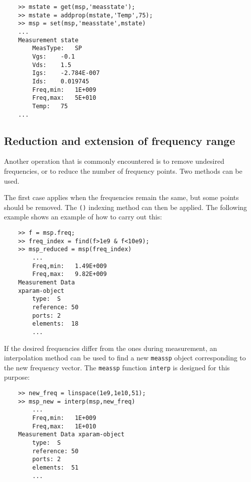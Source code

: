 \begin{small}
\begin{verbatim}
    >> mstate = get(msp,'measstate');
    >> mstate = addprop(mstate,'Temp',75);
    >> msp = set(msp,'measstate',mstate)
    ...
    Measurement state
        MeasType:   SP
        Vgs:    -0.1
        Vds:    1.5
        Igs:    -2.784E-007
        Ids:    0.019745
        Freq,min:   1E+009
        Freq,max:   5E+010
        Temp:   75
    ...
\end{verbatim}
\end{small}

\subsection{Reduction and extension of frequency range}
Another operation that is commonly encountered is to remove
undesired frequencies, or to reduce the number of frequency
points. Two methods can be used.

The first case applies when the frequencies remain the same, but
some points should be removed. The \verb"()" indexing method can
then be applied. The following example shows an example of how to
carry out this:

\begin{small}
\begin{verbatim}
    >> f = msp.freq;
    >> freq_index = find(f>1e9 & f<10e9);
    >> msp_reduced = msp(freq_index)
        ...
        Freq,min:   1.49E+009
        Freq,max:   9.82E+009
    Measurement Data
    xparam-object
        type:  S
        reference: 50
        ports: 2
        elements:  18
        ...
\end{verbatim}
\end{small}

If the desired frequencies differ from the ones during
measurement, an interpolation method can be used to find a new
\verb"meassp" object corresponding to the new frequency vector.
The \verb"meassp" function \verb"interp" is designed for this
purpose:

\begin{small}
\begin{verbatim}
    >> new_freq = linspace(1e9,1e10,51);
    >> msp_new = interp(msp,new_freq)
        ...
        Freq,min:   1E+009
        Freq,max:   1E+010
    Measurement Data xparam-object
        type:  S
        reference: 50
        ports: 2
        elements:  51
        ...
\end{verbatim}
\end{small}
